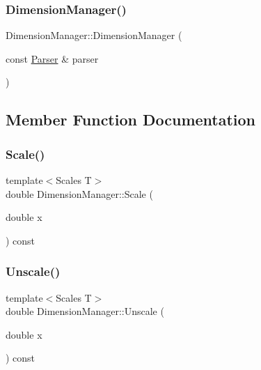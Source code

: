 \subsubsection{\texorpdfstring{Dimension\+Manager()}{DimensionManager()}}
{\footnotesize\ttfamily Dimension\+Manager\+::\+Dimension\+Manager (\begin{DoxyParamCaption}\item[{const \hyperlink{structParser}{Parser} \&}]{parser }\end{DoxyParamCaption})\hspace{0.3cm}{\ttfamily [explicit]}}



\subsection{Member Function Documentation}
\mbox{\label{structDimensionManager_ad7fac9ebd57da5ade091bfe0eef2c7f2}} 
\subsubsection{\texorpdfstring{Scale()}{Scale()}}
{\footnotesize\ttfamily template$<$Scales T$>$ \\
double Dimension\+Manager\+::\+Scale (\begin{DoxyParamCaption}\item[{double}]{x }\end{DoxyParamCaption}) const\hspace{0.3cm}{\ttfamily [inline]}}

\mbox{\label{structDimensionManager_ab178f6b5cdd976d1c51dcb6057e205a9}} 
\subsubsection{\texorpdfstring{Unscale()}{Unscale()}}
{\footnotesize\ttfamily template$<$Scales T$>$ \\
double Dimension\+Manager\+::\+Unscale (\begin{DoxyParamCaption}\item[{double}]{x }\end{DoxyParamCaption}) const\hspace{0.3cm}{\ttfamily [inline]}}



